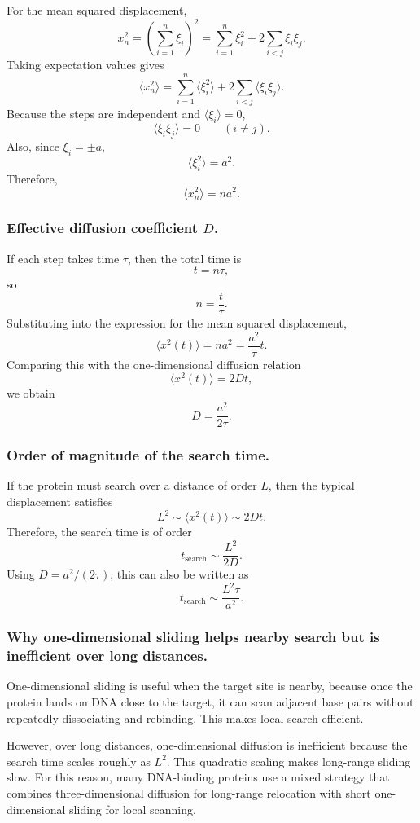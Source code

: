 \documentclass[12pt,a4paper]{article}
\begin{document}
For the mean squared displacement,
\[
  x_n^2=\left(\sum_{i=1}^{n}\xi_i\right)^2=\sum_{i=1}^{n}\xi_i^2+2\sum_{i<j}\xi_i\xi_j.
\]
Taking expectation values gives
\[
  \langle x_n^2\rangle=\sum_{i=1}^{n}\langle \xi_i^2\rangle+2\sum_{i<j}\langle \xi_i\xi_j\rangle.
\]
Because the steps are independent and $\langle \xi_i\rangle=0$,
\[
  \langle \xi_i\xi_j\rangle=0\qquad(i\neq j).
\]
Also, since $\xi_i=\pm a$,
\[
  \langle \xi_i^2\rangle=a^2.
\]
Therefore,
\[
  \langle x_n^2\rangle=na^2.
\]

\subsubsection{Effective diffusion coefficient \texorpdfstring{$D$}{D}.}
If each step takes time $\tau$, then the total time is
\[
  t=n\tau,
\]
so
\[
  n=\frac{t}{\tau}.
\]
Substituting into the expression for the mean squared displacement,
\[
  \langle x^2(t)\rangle=na^2=\frac{a^2}{\tau}t.
\]
Comparing this with the one-dimensional diffusion relation
\[
  \langle x^2(t)\rangle=2Dt,
\]
we obtain
\[
  D=\frac{a^2}{2\tau}.
\]

\subsubsection{Order of magnitude of the search time.}
If the protein must search over a distance of order $L$, then the typical displacement satisfies
\[
  L^2\sim \langle x^2(t)\rangle\sim 2Dt.
\]
Therefore, the search time is of order
\[
  t_{\mathrm{search}}\sim \frac{L^2}{2D}.
\]
Using $D=a^2/(2\tau)$, this can also be written as
\[
  t_{\mathrm{search}}\sim \frac{L^2\tau}{a^2}.
\]

\subsubsection{Why one-dimensional sliding helps nearby search but is inefficient over long distances.}
One-dimensional sliding is useful when the target site is nearby, because once the protein lands on DNA close to the target, it can scan adjacent base pairs without repeatedly dissociating and rebinding. This makes local search efficient.

However, over long distances, one-dimensional diffusion is inefficient because the search time scales roughly as $L^2$. This quadratic scaling makes long-range sliding slow. For this reason, many DNA-binding proteins use a mixed strategy that combines three-dimensional diffusion for long-range relocation with short one-dimensional sliding for local scanning.
\end{document}
